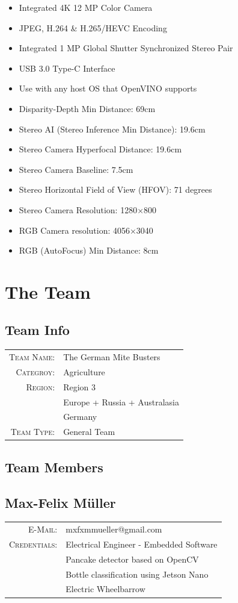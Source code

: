 \documentclass[a4paper,titlepage]{article}
\begin{document}
\begin{itemize}
    \item Integrated 4K 12 MP Color Camera
    \item JPEG, H.264 \& H.265/HEVC Encoding
    \item Integrated 1 MP Global Shutter Synchronized Stereo Pair
    \item USB 3.0 Type-C Interface
    \item Use with any host OS that OpenVINO supports
    \item Disparity-Depth Min Distance: 69cm
    \item Stereo AI (Stereo Inference Min Distance): 19.6cm
    \item Stereo Camera Hyperfocal Distance: 19.6cm
    \item Stereo Camera Baseline: 7.5cm
    \item Stereo Horizontal Field of View (HFOV): 71 degrees
    \item Stereo Camera Resolution: 1280×800
    \item RGB Camera resolution: 4056×3040
    \item RGB (AutoFocus) Min Distance: 8cm
\end{itemize}

\newpage
\section{The Team}

\subsection{Team Info}

\begin{tabular}{rl}
\textsc{Team Name:} & The German Mite Busters \\
\textsc{Categroy:} & Agriculture \\
\textsc{Region:} & Region 3 \\
\textsc & Europe + Russia + Australasia \\
\textsc & Germany \\
\textsc{Team Type:} & General Team \\
\end{tabular}

\subsection{Team Members}

\subsection*{Max-Felix Müller}
\begin{tabular}{rl}
\textsc{E-Mail:} & mxfxmmueller@gmail.com \\
\textsc{Credentials:} & Electrical Engineer - Embedded Software \\
\textsc & Pancake detector based on OpenCV \\
\textsc & Bottle classification using Jetson Nano \\
\textsc & Electric Wheelbarrow
\end{tabular}
\end{document}
